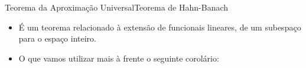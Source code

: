 \documentclass[13pt]{beamer}
\begin{document}





\begin{frame}{Teorema da Aproximação Universal}{Teorema de Hahn-Banach}
    \begin{itemize}
        \item<1-> É um teorema relacionado à extensão de funcionais lineares, de um subespaço para o espaço inteiro.
        \item<2-> O que vamos utilizar mais à frente o seguinte corolário:
    \end{itemize}
\end{frame}
\end{document}
